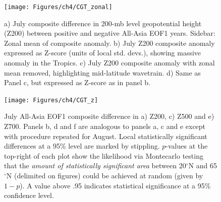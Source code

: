 %
%
%
%


\clearpage
\newpage	

\begin{figure}
\centering
\noindent\texttt{[image: Figures/ch4/CGT\_zonal]}
\caption{a) July composite difference in 200-mb level geopotential height (Z200) between positive and negative All-Asia EOF1 years. Sidebar: Zonal mean of composite anomaly. b) July Z200 composite anomaly expressed as Z-score (units of local std. devs.), showing massive anomaly in the Tropics. c) July Z200 composite anomaly with zonal mean removed, highlighting mid-latitude wavetrain. d) Same as Panel c, but expressed as Z-score as in panel b.}
\label{fig:cgt_zonal}
\end{figure}

\begin{figure}
\centering
\noindent\texttt{[image: Figures/ch4/CGT\_z]}
\caption{July All-Asia EOF1 composite difference in a) Z200, c) Z500 and e) Z700. Panels b, d and f are analogous to panels a, c and e except with procedure repeated for August. Local statistically significant differences at a 95\% level are marked by stippling. $p$-values at the top-right of each plot show the likelihood via Montecarlo testing that the \textit{amount of statistically significant area} between 20$^{\circ}$N and 65$^{\circ}$N (delimited on figures) could be achieved at random (given by $1-p$). A value above .95 indicates statistical significance at a 95\% confidence level.}
\label{fig:cgt_z}
\end{figure}

